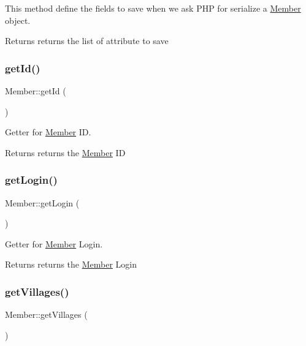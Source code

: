 This method define the fields to save when we ask P\+HP for serialize a \mbox{\hyperlink{classMember}{Member}} object. 

\begin{DoxyReturn}{Returns}
returns the list of attribute to save 
\end{DoxyReturn}
\mbox{\label{classMember_a4c2dcf5c05164f9575bc01237756109f}} 
\subsubsection{\texorpdfstring{get\+Id()}{getId()}}
{\footnotesize\ttfamily Member\+::get\+Id (\begin{DoxyParamCaption}{ }\end{DoxyParamCaption})}



Getter for \mbox{\hyperlink{classMember}{Member}} ID. 

\begin{DoxyReturn}{Returns}
returns the \mbox{\hyperlink{classMember}{Member}} ID 
\end{DoxyReturn}
\mbox{\label{classMember_a24f3ec8686336825d65d4c3ce1ca995a}} 
\subsubsection{\texorpdfstring{get\+Login()}{getLogin()}}
{\footnotesize\ttfamily Member\+::get\+Login (\begin{DoxyParamCaption}{ }\end{DoxyParamCaption})}



Getter for \mbox{\hyperlink{classMember}{Member}} Login. 

\begin{DoxyReturn}{Returns}
returns the \mbox{\hyperlink{classMember}{Member}} Login 
\end{DoxyReturn}
\mbox{\label{classMember_a8fffb15679150731080b062cf4770f7d}} 
\subsubsection{\texorpdfstring{get\+Villages()}{getVillages()}}
{\footnotesize\ttfamily Member\+::get\+Villages (\begin{DoxyParamCaption}{ }\end{DoxyParamCaption})}



